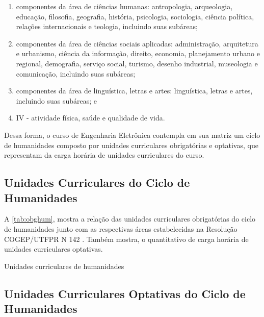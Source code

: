 \begin{enumerate}
	\item componentes da área de ciências humanas: antropologia, arqueologia, educação, filosofia, geografia, história, psicologia, sociologia, ciência política, relações internacionais e teologia, incluindo suas subáreas;
	\item componentes da área de ciências sociais aplicadas: administração, arquitetura e urbanismo, ciência da informação, direito, economia, planejamento urbano e regional, demografia, serviço social, turismo, desenho industrial, museologia e comunicação, incluindo suas subáreas;
	\item componentes da área de linguística, letras e artes: linguística, letras e artes, incluindo suas subáreas; e
	\item IV - atividade física, saúde e qualidade de vida.
\end{enumerate}

Dessa forma, o curso de Engenharia Eletrônica contempla em sua matriz um ciclo de humanidades composto por unidades curriculares obrigatórias e optativas, que representam \percentagem{\the\value{horasH}}{\the\value{horasUC}} da carga horária de unidades curriculares do curso. 


\subsection{Unidades Curriculares do Ciclo de Humanidades}
\label{subsec:obghumanidades}

A \autoref{tab:obghum}, mostra a relação das unidades curriculares obrigatórias do ciclo de humanidades junto com as respectivas áreas estabelecidas na Resolução COGEP/UTFPR N\textordmasculine{} 142 \cite{cogep142}. Também mostra, o quantitativo de carga horária de unidades curriculares optativas.

\begin{table}[!htb]
	\centering\footnotesize
	\caption{Unidades curriculares de humanidades}
	\label{tab:obghum}
\end{table}

\subsection{Unidades Curriculares Optativas do Ciclo de Humanidades}
\label{subsec:opthumanidades}

